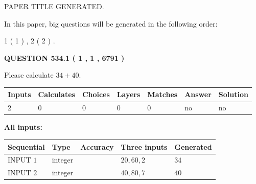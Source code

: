 \documentclass[12pt]{article}
\begin{document}
   
\vspace{0.2in}
   
   
   
   
   
   
   
   
 \vspace{0.2in}
 
 
 
 
   
   
 PAPER TITLE GENERATED.
   
   
   
\vspace{0.2in}
   
In this paper, big questions will be generated in the following order: 
   
   
   1 ( 1 )
 ,
   2 ( 2 )
 .
  
\vspace{0.2in}
  
{\textbf{\Large{QUESTION
534.1 
 ( 1 , 1 , 6791 )
}}}
  
  
 
Please calculate $ %
34 +  %
40 $.
 
 
   
   
   
   
\noindent\begin{tabular}{|l|l|l|l|l|l|l|}
 \hline
Inputs & Calculates & Choices & Layers & Matches & Answer & Solution \\ \hline
 2  & 
 0  & 
 0
  & 
 0  & 
 0  & 
  no & 
  no 
  \\ \hline
 \end{tabular}
   
   
   
   
\noindent{}
   
   
   
   
\noindent\vspace{0.1in}\hspace{-0.08in} {\textbf{\Large{All inputs: }}}
   
   
  
  
\noindent\begin{tabular}{|l|l|l|l|l|}
\hline
 Sequential & Type & Accuracy & Three inputs & Generated \\ 
\hline
 
 
  INPUT $  1 $ & integer &  & $
 20
 , 
 60
 , 
 2
 $ & $ 34 $ 
 \\  \hline  
 
 
  INPUT $  2 $ & integer &  & $
 40
 , 
 80
 , 
 7
 $ & $ 40 $ 
 \\  \hline  
 \end{tabular}
   
\end{document}
